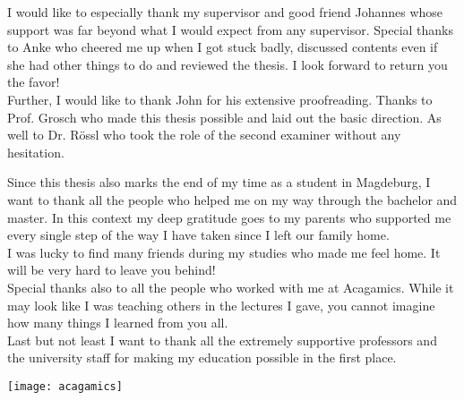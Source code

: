 \documentclass[thesis.tex]{subfiles}
\begin{document}
\label{chap:Acknowledgments}

I would like to especially thank my supervisor and good friend Johannes whose support was far beyond what I would expect from any supervisor.
Special thanks to Anke who cheered me up when I got stuck badly, discussed contents even if she had other things to do and reviewed the thesis.
I look forward to return you the favor!
\\
Further, I would like to thank John for his extensive proofreading.
Thanks to Prof. Grosch who made this thesis possible and laid out the basic direction.
As well to Dr. Rössl who took the role of the second examiner without any hesitation.

Since this thesis also marks the end of my time as a student in Magdeburg, I want to thank all the people who helped me on my way through the bachelor and master.
In this context my deep gratitude goes to my parents who supported me every single step of the way I have taken since I left our family home.
\\
I was lucky to find many friends during my studies who made me feel home.
It will be very hard to leave you behind!
\\
Special thanks also to all the people who worked with me at Acagamics.
While it may look like I was teaching others in the lectures I gave, you cannot imagine how many things I learned from you all.
\\
Last but not least I want to thank all the extremely supportive professors and the university staff for making my education possible in the first place.

\begin{figure*}
\centering
\texttt{[image: acagamics]}
\end{figure*}

\newpage
\end{document}
